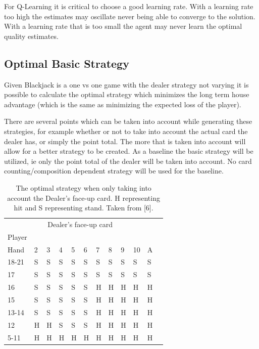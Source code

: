 \documentclass[10pt, a4paper, twocolumn]{article}
\begin{document}
For Q-Learning it is critical to choose a good learning rate. With a learning rate too high the estimates may oscillate never being able to converge to the solution. With a learning rate that is too small the agent may never learn the optimal quality estimates. 

\subsection{Optimal Basic Strategy}

Given Blackjack is a one vs one game with the dealer strategy not varying it is possible to calculate the optimal strategy which minimizes the long term house advantage (which is the same as minimizing the expected loss of the player). 

There are several points which can be taken into account while generating these strategies, for example whether or not to take into account the actual card the dealer has, or simply the point total. The more that is taken into account will allow for a better strategy to be created. As a baseline the basic strategy will be utilized, ie only the point total of the dealer will be taken into account. No card counting/composition dependent strategy will be used for the baseline. 

\begin{table}[H]
	\centering
	\begin{tabular}{lllllllllllr}
		\toprule
		\multicolumn{11}{c}{Dealer's face-up card} \\
		Player \\ Hand & 2 & 3 & 4 & 5 & 6 & 7 & 8 & 9 & 10 & A \\
		\midrule
		18-21 & S & S & S & S & S & S & S & S & S & S \\
		17 & S & S & S & S & S & S & S & S & S & S \\
		16 & S & S & S & S & S & H & H & H & H & H \\
		15 & S & S & S & S & S & H & H & H & H & H \\
		13-14 & S & S & S & S & S & H & H & H & H & H \\
		12 & H & H & S & S & S & H & H & H & H & H \\
		5-11 & H & H & H & H & H & H & H & H & H & H \\
		\bottomrule
	\end{tabular}
	\caption{The optimal strategy when only taking into account the Dealer's face-up card. H representing hit and S representing stand. Taken from [6].}
\end{table}
\end{document}
